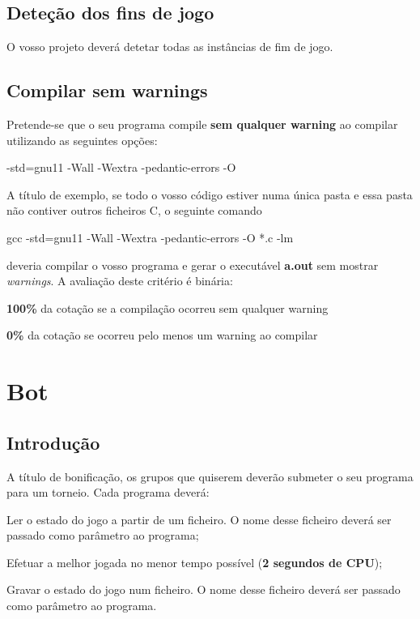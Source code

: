 \subsection*{Deteção dos fins de jogo}

O vosso projeto deverá detetar todas as instâncias de fim de jogo.

\subsection*{Compilar sem warnings}

Pretende-\/se que o seu programa compile {\bfseries sem qualquer warning} ao compilar utilizando as seguintes opções\+: \begin{DoxyVerb}-std=gnu11 -Wall -Wextra -pedantic-errors -O
\end{DoxyVerb}


A título de exemplo, se todo o vosso código estiver numa única pasta e essa pasta não contiver outros ficheiros C, o seguinte comando \begin{DoxyVerb}gcc -std=gnu11 -Wall -Wextra -pedantic-errors -O *.c -lm
\end{DoxyVerb}


deveria compilar o vosso programa e gerar o executável {\bfseries a.\+out} sem mostrar {\itshape warnings}. A avaliação deste critério é binária\+:


\begin{DoxyItemize}
\item {\bfseries 100\%} da cotação se a compilação ocorreu sem qualquer warning
\item {\bfseries 0\%} da cotação se ocorreu pelo menos um warning ao compilar
\end{DoxyItemize}

\section*{Bot}

\subsection*{Introdução}

A título de bonificação, os grupos que quiserem deverão submeter o seu programa para um torneio. Cada programa deverá\+:


\begin{DoxyEnumerate}
\item Ler o estado do jogo a partir de um ficheiro. O nome desse ficheiro deverá ser passado como parâmetro ao programa;
\end{DoxyEnumerate}
\begin{DoxyEnumerate}
\item Efetuar a melhor jogada no menor tempo possível ({\bfseries 2 segundos de C\+PU});
\end{DoxyEnumerate}
\begin{DoxyEnumerate}
\item Gravar o estado do jogo num ficheiro. O nome desse ficheiro deverá ser passado como parâmetro ao programa.
\end{DoxyEnumerate}

